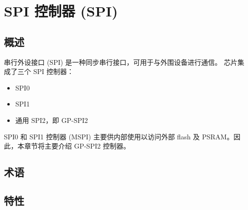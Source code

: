 \documentclass[main\_\_CN.tex]{subfiles}
\begin{document}

\ifglobal
\else
    {\let\clearpage\relax \listoftodos}
    \tableofcontents
\fi


\hypertarget{spi}{}
\chapter{SPI 控制器 (SPI)}
\label{mod:spi}


\section{概述}

串行外设接口 (SPI) 是一种同步串行接口，可用于与外围设备进行通信。\chipname{} 芯片集成了三个 SPI 控制器：
\begin{itemize}
  \item SPI0
  \item SPI1
  \item 通用 SPI2，即 GP-SPI2
\end{itemize}
SPI0 和 SPI1 控制器 (MSPI) 主要供内部使用以访问外部 flash 及 PSRAM。因此，本章节将主要介绍 GP-SPI2 控制器。

\section{术语}


\vspace{-2em}
\section{特性}
\end{document}
